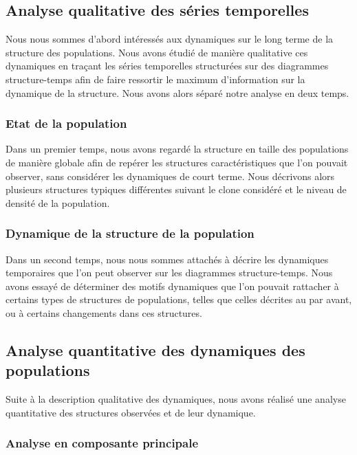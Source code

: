 \subsection{Analyse qualitative des séries temporelles}

Nous nous sommes d'abord intéressés aux dynamiques sur le long
terme de la structure des populations. Nous avons étudié de manière
qualitative ces dynamiques en traçant les séries temporelles structurées sur des
diagrammes structure-temps afin de faire ressortir le maximum d'information sur
la dynamique de la structure.
Nous avons alors séparé notre analyse en deux temps.

\subsubsection{Etat de la population}

Dans un premier temps, nous avons regardé la structure en taille des populations
de manière globale afin de repérer les structures caractéristiques que l'on
pouvait observer, sans considérer les dynamiques de court terme. Nous décrivons
alors plusieurs structures typiques différentes suivant le clone considéré et le
niveau de densité de la population.

\subsubsection{Dynamique de la structure de la population}

Dans un second temps, nous nous sommes attachés à décrire les dynamiques
temporaires que l'on peut observer sur les diagrammes structure-temps. Nous
avons essayé de déterminer des motifs dynamiques que l'on pouvait rattacher à
certains types de structures de populations, telles que celles décrites au
par avant, ou à certains changements dans ces structures.

\subsection{Analyse quantitative des dynamiques des populations}

Suite à la description qualitative des dynamiques, nous avons réalisé une
analyse quantitative des structures observées et de leur dynamique. 

\subsubsection{Analyse en composante principale}

